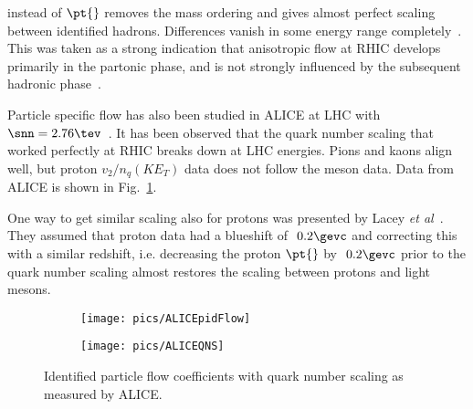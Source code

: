 \noindent instead of $\pt{}$ removes the mass ordering and gives almost perfect scaling between identified hadrons. Differences vanish in some energy range completely~\cite{Phenix2008}. This was taken as a strong indication that anisotropic flow at RHIC develops primarily in the partonic phase, and is not strongly influenced by the subsequent hadronic phase~\cite{Lacey:2012ma}.

Particle specific flow has also been studied in ALICE at LHC with $\snn=2.76\tev$~\cite{Lacey:2012ma}. It has been observed that the quark number scaling that worked perfectly at RHIC breaks down at LHC energies. Pions and kaons align well, but proton $v_2/n_q\left(KE_T\right)$ data does not follow the meson data. Data from ALICE is shown in Fig.~\ref{fig:ALICEQNS}.

One way to get similar scaling also for protons was presented by Lacey \emph{et al}~\cite{Lacey:2012ma}. They assumed that proton data had a blueshift of $~0.2\gevc$ and correcting this with a similar redshift, i.e. decreasing the proton $\pt{}$ by $~0.2\gevc$ prior to the quark number scaling almost restores the scaling between protons and light mesons.


\begin{figure}[tbh]
	\centering
	\begin{subfigure}[t]{0.48\textwidth}
                \texttt{[image: pics/ALICEpidFlow]}

        \end{subfigure}
        \quad
        \begin{subfigure}[t]{0.48\textwidth}
        \texttt{[image: pics/ALICEQNS]}
        \end{subfigure} 

        \caption[Quark number scaling in ALICE]{Identified particle flow coefficients with quark number scaling as measured by ALICE.}
        \label{fig:ALICEQNS}
\end{figure}


